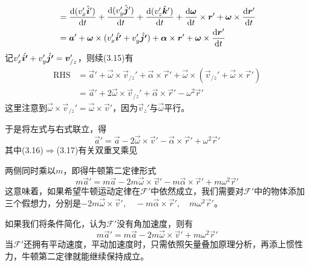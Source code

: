 \begin{prove}
\begin{align}
		&=\dfrac{\dif(v_x'\base{i}')}{\dif t}+\dfrac{\dif(v_y'\base{j}')}{\dif t}+\dfrac{\dif(v_z'\base{k}')}{\dif t}+\dfrac{\dif\vec{\omega}}{\dif t}\times\vec{r}'+\vec{\omega}\times\dfrac{\dif\vec{r}'}{\dif t}\\
		&=\vec{a}'+\vec{\omega}\times(v_x'\base{i'}+v_y'\base{j'})+\vec{\alpha}\times\vec{r}'+\vec{\omega}\times\dfrac{\dif\vec{r}'}{\dif t}
	\end{align}
	记$v_x'\hat{\boldsymbol{i'}}+v_y'\hat{\boldsymbol{j'}}=\boldsymbol{v}_{/z}'$，则续(3.15)有
	\begin{align}
		\mathrm{RHS}&=\vec{a}'+\vec{\omega}\times\vec{v}_{/z}'+\vec{\alpha}\times\vec{r}'+\vec{\omega}\times(\vec{v}_{/z}'+\vec{\omega}\times\vec{r}')\\
		&=\vec{a}'+2\vec{\omega}\times\vec{v}_{/z}'+\vec{\alpha}\times\vec{r}'-\omega^2\vec{r}'
	\end{align}
	这里注意到$\vec{\omega}\times\vec{v}_{/z}'=\vec{\omega}\times\vec{v}'$，因为$\vec{v}_z'$与$\vec{\omega}$平行。
	
	于是将左式与右式联立，得
	\[\vec{a}'=\vec{a}-2\vec{\omega}\times\vec{v}'-\vec{\alpha}\times\vec{r}'+\omega^2\vec{r}'\]
	其中(3.16)$\Rightarrow$(3.17)有关双重叉乘见
	
	两侧同时乘以$m$，即得牛顿第二定律形式
	\[m\vec{a}'=m\vec{a}-2m\vec{\omega}\times\vec{v}'-m\vec{\alpha}\times\vec{r}'+m\omega^2\vec{r}'\]
	这意味着，如果希望牛顿运动定律在$\mathcal{F}'$中依然成立，我们需要对$\mathcal{F}'$中的物体添加三个假想力，分别是$-2m\vec{\omega}\times\vec{v}',\quad-m\vec{\alpha}\times\vec{r}',\quad m\omega^2\vec{r}'$。
	
	如果我们将条件简化，认为$\mathcal{F}'$没有角加速度，则有
	\[m\vec{a}'=m\vec{a}-2m\vec{\omega}\times\vec{v}'+m\omega^2\vec{r}'\]
	当$\mathcal{F}'$还拥有平动速度，平动加速度时，只需依照矢量叠加原理分析，再添上惯性力，牛顿第二定律就能继续保持成立。
\end{prove}
